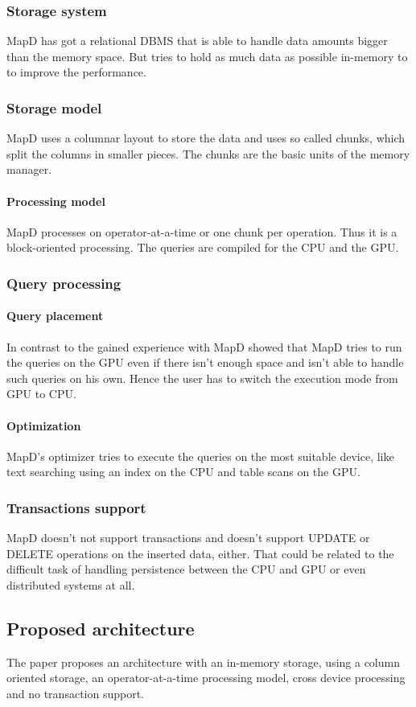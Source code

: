\subsubsection{Storage system} MapD has got a relational DBMS that is able to handle data amounts bigger than the memory space.
But tries to hold as much data as possible in-memory to to improve the performance.
\subsubsection{Storage model} MapD uses a columnar layout to store the data and uses so called chunks, which split the columns in smaller pieces.
The chunks are the basic units of the memory manager.
\paragraph{Processing model} MapD processes on operator-at-a-time or one chunk per operation. Thus it is a block-oriented processing.
The queries are compiled for the CPU and the GPU.
\subsubsection{Query processing}
\paragraph{Query placement} In contrast to \cite{bress2014gpu} the gained experience with MapD showed that MapD tries to run the queries on the GPU even if there isn't enough space and isn't able to handle such queries on his own.
Hence the user has to switch the execution mode from GPU to CPU.
\paragraph{Optimization} MapD's optimizer tries to execute the queries on the most suitable device, like text searching using an index on the CPU and table scans on the GPU.
\subsubsection{Transactions support} MapD doesn't not support transactions and doesn't support UPDATE or DELETE operations on the inserted data, either.
That could be related to the difficult task of handling persistence between the CPU and GPU or even distributed systems at all.

\subsection{Proposed architecture}
The paper \cite{bress2014gpu} proposes an architecture with an in-memory storage, using a column oriented storage, an operator-at-a-time processing model, cross device processing and no transaction support.


